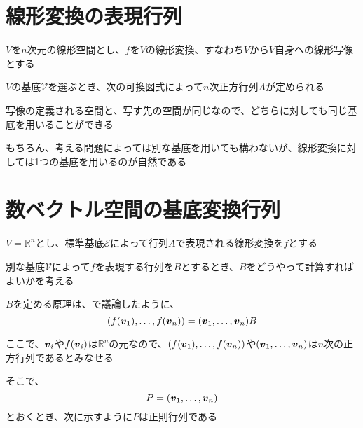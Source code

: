 \documentclass[../../../topic_linear-algebra]{subfiles}
\begin{document}
\sectionline
\section{線形変換の表現行列}

$V$を$n$次元の線形空間とし、$f$を$V$の線形変換、すなわち$V$から$V$自身への線形写像とする

$V$の基底$\mathcal{V}$を選ぶとき、次の可換図式によって$n$次正方行列$A$が定められる
\begin{center}
\end{center}

写像の定義される空間と、写す先の空間が同じなので、どちらに対しても同じ基底を用いることができる

\br

もちろん、考える問題によっては別な基底を用いても構わないが、線形変換に対しては1つの基底を用いるのが自然である

\sectionline
\section{数ベクトル空間の基底変換行列}

$V = \mathbb{R}^n$とし、標準基底$\mathcal{E}$によって行列$A$で表現される線形変換を$f$とする

別な基底$\mathcal{V}$によって$f$を表現する行列を$B$とするとき、$B$をどうやって計算すればよいかを考える

\br

$B$を定める原理は、で議論したように、
\begin{equation*}
  (f(\vb*{v}_1), \ldots, f(\vb*{v}_n)) = (\vb*{v}_1, \ldots, \vb*{v}_n) B
\end{equation*}

ここで、$\vb*{v}_i$や$f(\vb*{v}_i)$は$\mathbb{R}^n$の元なので、$(f(\vb*{v}_1), \ldots, f(\vb*{v}_n))$や$(\vb*{v}_1, \ldots, \vb*{v}_n)$は$n$次の正方行列であるとみなせる

そこで、
\begin{equation*}
  P = (\vb*{v}_1, \ldots, \vb*{v}_n)
\end{equation*}
とおくとき、次に示すように$P$は正則行列である
\end{document}
